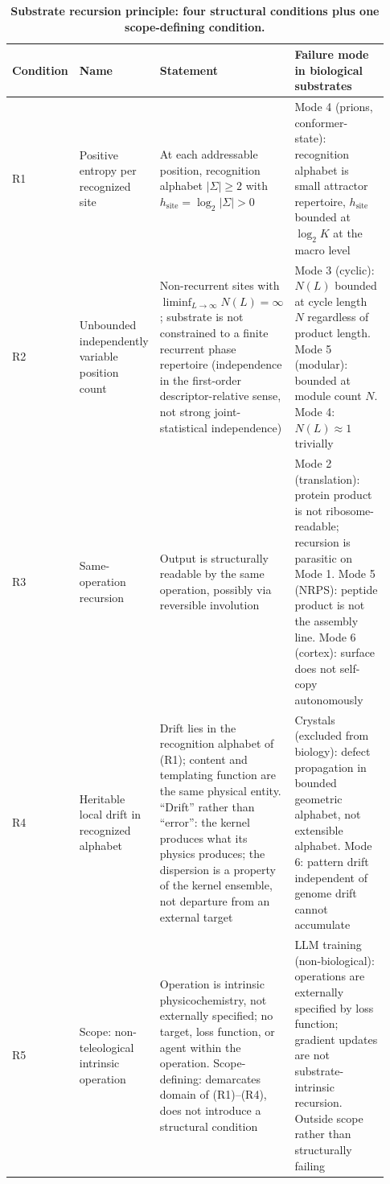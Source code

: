 \documentclass[aps,prx,reprint,amsmath,amssymb,floatfix,superscriptaddress,nofootinbib]{revtex4-2}
\theoremstyle{plain-thm}
\theoremstyle{definition-thm}
\begin{document}
\begin{table}
\caption{\textbf{Substrate recursion principle: four structural conditions plus one scope-defining condition.}}
\label{tab:principle}
\begin{tabular}{p{0.05\linewidth} p{0.18\linewidth} p{0.30\linewidth} p{0.40\linewidth}}
\toprule
Condition & Name & Statement & Failure mode in biological substrates \\
\midrule
R1 & Positive entropy per recognized site & At each addressable position, recognition alphabet $|\Sigma| \ge 2$ with $h_{\mathrm{site}} = \log_2 |\Sigma| > 0$ & Mode 4 (prions, conformer-state): recognition alphabet is small attractor repertoire, $h_{\mathrm{site}}$ bounded at $\log_2 K$ at the macro level \\
R2 & Unbounded independently variable position count & Non-recurrent sites with $\liminf_{L\to\infty} N(L) = \infty$; substrate is not constrained to a finite recurrent phase repertoire (independence in the first-order descriptor-relative sense, not strong joint-statistical independence) & Mode 3 (cyclic): $N(L)$ bounded at cycle length $N$ regardless of product length. Mode 5 (modular): bounded at module count $N$. Mode 4: $N(L) \approx 1$ trivially \\
R3 & Same-operation recursion & Output is structurally readable by the same operation, possibly via reversible involution & Mode 2 (translation): protein product is not ribosome-readable; recursion is parasitic on Mode 1. Mode 5 (NRPS): peptide product is not the assembly line. Mode 6 (cortex): surface does not self-copy autonomously \\
R4 & Heritable local drift in recognized alphabet & Drift lies in the recognition alphabet of (R1); content and templating function are the same physical entity. ``Drift'' rather than ``error'': the kernel produces what its physics produces; the dispersion is a property of the kernel ensemble, not departure from an external target & Crystals (excluded from biology): defect propagation in bounded geometric alphabet, not extensible alphabet. Mode 6: pattern drift independent of genome drift cannot accumulate \\
R5 & Scope: non-teleological intrinsic operation & Operation is intrinsic physicochemistry, not externally specified; no target, loss function, or agent within the operation. Scope-defining: demarcates domain of (R1)--(R4), does not introduce a structural condition & LLM training (non-biological): operations are externally specified by loss function; gradient updates are not substrate-intrinsic recursion. Outside scope rather than structurally failing \\
\bottomrule
\end{tabular}
\end{table}
\end{document}
